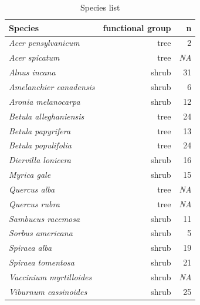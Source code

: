 \documentclass{article}[12pt]
\begin{document}
\clearpage
\begin{table}[ht] %
\centering
\caption{Species list} 
\label{listSp}
\begin{tabular}{lrr}
  \hline
Species & functional group & n \\ 
  \hline
  \emph{Acer pensylvanicum} & tree  & 2 \\ 
  \emph{Acer spicatum} & tree & \emph{NA}  \\ 
   \emph{Alnus incana} & shrub & 31 \\ 
   \emph{Amelanchier canadensis} &  shrub & 6  \\ 
  \emph{Aronia melanocarpa} & shrub & 12 \\ 
  \emph{Betula alleghaniensis} &  tree & 24\\ 
  \emph{Betula papyrifera} &   tree & 13 \\ 
  \emph{Betula populifolia} &  tree & 24\\ 
  \emph{Diervilla lonicera} &  shrub  & 16 \\ 
  \emph{Myrica gale} &  shrub & 15\\ 
  \emph{Quercus alba} &  tree & \emph{NA}\\ 
  \emph{Quercus rubra} &  tree & \emph{NA}\\ 
  \emph{Sambucus racemosa} &  shrub & 11\\ 
  \emph{Sorbus americana} &  shrub & 5\\
  \emph{Spiraea alba} &  shrub & 19\\ 
  \emph{Spiraea tomentosa} &   shrub & 21 \\ 
  \emph{Vaccinium myrtilloides} &  shrub & \emph{NA}\\ 
  \emph{Viburnum cassinoides} &  shrub & 25 \\ 
  \end{tabular}
\end{table}


\newpage

\end{document}
